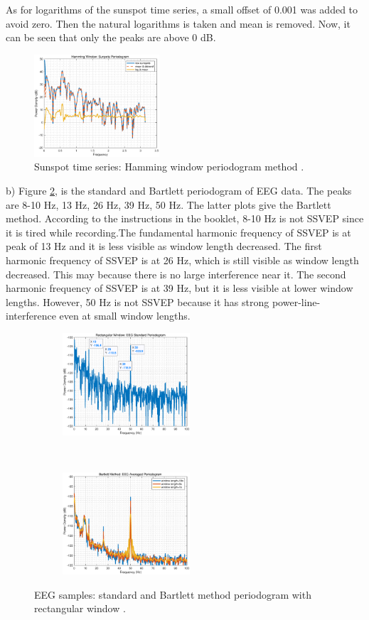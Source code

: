 As for logarithms of the sunspot time series, a small offset of 0.001 was added to avoid zero. Then the natural logarithms is taken and mean is removed. Now, it can be seen that only the peaks are above 0 dB. 
\begin{figure}[H]
    \centering
        \includegraphics[height=1.5in]{Part1/1_2_a_2.eps}
    \caption{Sunspot time series: Hamming window periodogram method .}
    \label{fig:1_2_a}
\end{figure}
b) Figure \ref{fig:1_2_b_1}, is the standard and Bartlett periodogram of EEG data. The peaks are 8-10 Hz, 13 Hz, 26 Hz, 39 Hz, 50 Hz. The latter plots give the Bartlett method. 
According to the instructions in the booklet, 8-10 Hz is not SSVEP since it is tired while recording.The fundamental harmonic frequency of SSVEP is  at peak of 13 Hz and it is less visible as window length decreased. The first harmonic frequency of SSVEP is at 26 Hz, which is still visible as window length decreased. This may because there is no large interference near it. The second harmonic frequency of SSVEP is at 39 Hz, but it is less visible at lower window lengths. However, 50 Hz is not SSVEP because it has strong power-line-interference even at small window lengths. 

\begin{figure}[H]
    \centering
    \begin{subfigure}{0.35\textwidth}
        \centering
        \includegraphics[height=1.5in]{Part1/1_2_b_1.eps}
    \end{subfigure}
    ~ 
    \begin{subfigure}{0.35\textwidth}
        \centering
        \includegraphics[height=1.5in]{Part1/1_2_b_2.eps}
    \end{subfigure}
    \caption{EEG samples: standard and Bartlett method periodogram with rectangular window .}
    \label{fig:1_2_b_1}
\end{figure}

